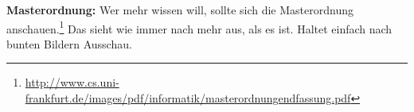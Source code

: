 \textbf{Masterordnung:} Wer mehr wissen will, sollte sich die Masterordnung anschauen.\footnote{\url{http://www.cs.uni-frankfurt.de/images/pdf/informatik/masterordnungendfassung.pdf}} Das sieht wie immer nach mehr aus, als es ist. Haltet einfach nach bunten Bildern Ausschau.

\spaltenende
